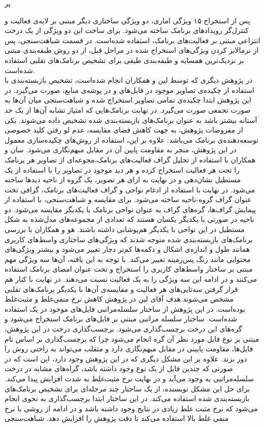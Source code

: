 ‌پر

پس از استخراج ۱۵ ویژگی اماری، دو ویژگی ساختاری دیگر مبتنی بر لایه‌ی فعالیت و کنترل‌گر رویداد‌های برنامک ساخته می‌شود. برای ساخت این دو ویژگی از یک درخت انتزاعی مبتنی بر فعالیت‌های برنامک، استفاده شده‌است. در قسمت شباهت‌سنجی، پس از نرمالایز کردن ویژگی‌های استخراج شده در مراحل قبل، از دو روش طبقه‌بندی مبتنی بر نزدیک‌ترین همسایه و طبقه‌بندی طیفی برای تشخیص برنامک‌های تقلبی استفاده شده‌است.\\
در پژوهش دیگری که توسط لین و همکاران انجام شده‌است، تشخیص بازبسته‌بندی با استفاده از چکیده‌ی تصاویر موجود در فایل‌های  و در پوشه‌ی منابع، صورت می‌گیرد. در این پژوهش ابتدا چکیده‌ی تمامی تصاویر استخراج شده و شباهت‌سنجی میان آن‌ها به صورت تجمعی صورت می‌گیرد. در نهایت برنامک‌هایی که امتیاز تشابه آن‌ها از یک حد آستانه بیشتر باشد به عنوان برنامک‌های بازبسته‌بندی شده تشخیص داده‌ می‌شوند. یکی از مفروضات پژوهش، به جهت کاهش فضای مقایسه، عدم لو رفتن کلید خصوصی توسعه‌دهنده‌ی برنامک می‌باشد. علاوه بر این، استفاده از روش‌های چکیده‌سازی معمول در این پژوهش، منجر به مقاومت پایین آن‌ در مقابل مبهم‌نگاری می‌شود. سان و همکاران با استفاده از تحلیل گراف فعالیت‌های برنامک،مجوعه‌ای از تصاویر هر برنامک را تحت هر فعالیت استخراج کرده و هر دید موجود در تصاویر را با استفاده از یک مستطیل نشان‌دهی و در نهایت به ازای هر تصویر، یک گروه از ناحیه‌ دید‌ها ساخته می‌شود. در نهایت با استفاده از ادغام نواحی و گراف فعالیت‌های برنامک، گرافی تخت عنوان گراف گروه-ناحیه ساخته می‌شود. برای مقایسه و شباهت‌سنجی، با استفاده از پیمایش  گراف‌ها، گره‌های گراف به عنوان نواحی برنامک با یکدیگر مقایسه می‌شود.  دو ناحیه در صورتی با یکدیگر یکسان هستند که تعدادی از مجموعه‌های مدل‌شده به شکل مستطیل در این نواحی با یکدیگر هم‌پوشانی داشته باشند. هو و همکاران با بررسی برنامک‌های بازبسته‌بندی شده متوجه‌ شدند که ویژگی‌های ساختاری واسط‌های کاربری همانند طول و اندازه‌ی اشکال و دکمه‌ها کم‌تر دچار تغییر می‌شود و بیشتر ویژگی‌های محتوایی مانند رنگ پس‌زمینه تغییر می‌کند. با توجه به این یافته، آن‌ها سه ویژگی مهم مبتنی بر ساختار واسط‌های کاربری را استخراج و تحت عنوان امضا‌ی برنامک استفاده می‌کنند و در ادامه این سه ویژگی را به یک فعالیت نسبت می‌دهند. در نهایت با کنار هم قرار گرفتن سه‌تایی‌های هر فعالیت و مقایسه‌ی آن‌ها با یکدیگر برنامک‌های تقلبی مشخص می‌شوند.هدف آقای لین در پژوهش  کاهش نرخ منفی‌غلط و مثبت‌غلط بوده‌است. در این پژوهش از ساختار سلسله‌مراتبی فایل‌های موجود در یک  استفاده شده‌است. ساختار سلسله مراتبی مبتنی بر فایل‌های برنامک استخراج می‌شود و گره‌های این درخت برچسب‌گذاری می‌شود. برچسب‌گذاری درخت در این پژوهش، مبتنی بر نوع فایل‌ مورد نظر آن گره انجام می‌شود چرا که برچسب‌گذاری بر اساس نام فایل‌ها، مقاومت پایینی در مقابل مبهم‌نگاری دارد و متقلب می‌‌تواند به راحتی روش را دور بزند. علاوه بر این مشکل دیگری که در این پژوهش وجود دارد، این است که در صورتی که چندین فایل از یک نوع وجود داشته باشد، گراه‌های مشابه در درخت سلسله‌مراتبی به وجود می‌آید و در نهایت نرخ مثبت‌غلط به شدت افزایش پیدا‌ می‌کند. برای حل این مشکل نویسنده‌، از یک ساختار چند مرحله‌ای برای تشخیص برنامک‌های بازبسته‌بندی شده استفاده می‌کند. در این ساختار ابتدا برچسب‌گذاری به نحوی انجام می‌شود که نرخ مثبت غلط زیادی در نتایج وجود داشته باشد و در ادامه از روشی با نرخ منفی غلط بالا استفاده می‌کند تا دقت پژوهش را افزایش دهد. شباهت‌سنجی 